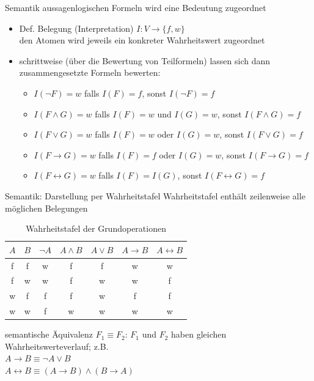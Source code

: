 \begin{frame}{Semantik}
	aussagenlogischen Formeln wird eine Bedeutung zugeordnet
	\begin{itemize}
		\item Def. Belegung (Interpretation) $I: V \rightarrow \{f, w\}$\\ den Atomen wird jeweils ein konkreter Wahrheitswert zugeordnet
		\item schrittweise (über die Bewertung von Teilformeln) lassen sich dann zusammengesetzte Formeln bewerten:
		\begin{itemize}
			\item $I(\neg F)=w$ falls $I(F)=f$, sonst $I(\neg F)=f$
			\item $I(F \land G)=w$ falls $I(F)=w$ und $I(G)=w$, sonst $I(F \land G)=f$
			\item $I(F \lor G)=w$ falls $I(F)=w$ oder $I(G)=w$, sonst $I(F \lor G)=f$
			\item $I(F \rightarrow G)=w$ falls $I(F)=f$ oder $I(G)=w$, sonst $I(F \rightarrow G)=f$
			\item $I(F \leftrightarrow G)=w$ falls $I(F)=I(G)$, sonst $I(F \leftrightarrow G)=f$
		\end{itemize}
	\end{itemize}
\end{frame}

\begin{frame}{Semantik: Darstellung per Wahrheitstafel}
	Wahrheitstafel enthält zeilenweise alle möglichen Belegungen
	\begin{table}
		\centering
			\begin{tabular}{|c|c|c|c|c|c|c|}
				\hline
				$A$ & $B$ & $\neg A$ & $A \land B$ & $A \lor B$ & $A \rightarrow B$ & $A \leftrightarrow B$ \\
				\hline
				f & f & w & f & f & w & w \\
				\hline
				f & w & w & f & w & w & f \\
				\hline
				w & f & f & f & w & f & f \\
				\hline
				w & w & f & w & w & w & w \\
				\hline
			\end{tabular}
			\caption{Wahrheitstafel der Grundoperationen}
		\end{table}
		semantische Äquivalenz $F_1 \equiv F_2$: $F_1$ und $F_2$ haben gleichen Wahrheitswerteverlauf; z.B.\\
		$A \rightarrow B \equiv \neg A \lor B$\\
		$A \leftrightarrow B \equiv (A \rightarrow B) \land (B \rightarrow A)$
\end{frame}


